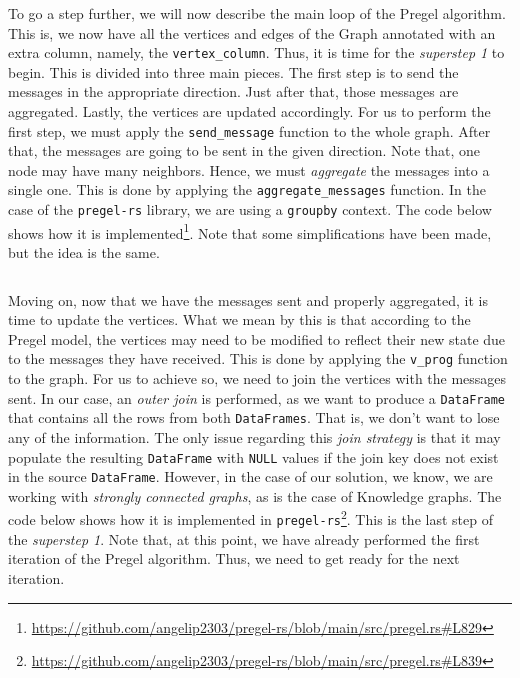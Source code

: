 \begin{code}
    \inputminted{rust}{code/listings/11-4_initial.rs}
\end{code}

To go a step further, we will now describe the main loop of the Pregel algorithm. This is, we now have all the vertices and edges of the Graph annotated with an extra column, namely, the \texttt{vertex\_column}. Thus, it is time for the \textit{superstep 1} to begin. This is divided into three main pieces. The first step is to send the messages in the appropriate direction. Just after that, those messages are aggregated. Lastly, the vertices are updated accordingly. For us to perform the first step, we must apply the \texttt{send\_message} function to the whole graph. After that, the messages are going to be sent in the given direction. Note that, one node may have many neighbors. Hence, we must \textit{aggregate} the messages into a single one. This is done by applying the \texttt{aggregate\_messages} function. In the case of the \texttt{pregel-rs} library, we are using a \texttt{groupby} context. The code below shows how it is implemented\footnote{\url{https://github.com/angelip2303/pregel-rs/blob/main/src/pregel.rs\#L829}}. Note that some simplifications have been made, but the idea is the same.

\begin{code}
    \inputminted{rust}{code/listings/11-5_msgs.rs}
\end{code}

Moving on, now that we have the messages sent and properly aggregated, it is time to update the vertices. What we mean by this is that according to the Pregel model, the vertices may need to be modified to reflect their new state due to the messages they have received. This is done by applying the \texttt{v\_prog} function to the graph. For us to achieve so, we need to join the vertices with the messages sent. In our case, an \textit{outer join} is performed, as we want to produce a \texttt{DataFrame} that contains all the rows from both \texttt{DataFrames}. That is, we don't want to lose any of the information. The only issue regarding this \textit{join strategy} is that it may populate the resulting \texttt{DataFrame} with \texttt{NULL} values if the join key does not exist in the source \texttt{DataFrame}. However, in the case of our solution, we know, we are working with \textit{strongly connected graphs}, as is the case of Knowledge graphs. The code below shows how it is implemented in \texttt{pregel-rs}\footnote{\url{https://github.com/angelip2303/pregel-rs/blob/main/src/pregel.rs\#L839}}. This is the last step of the \textit{superstep 1}. Note that, at this point, we have already performed the first iteration of the Pregel algorithm. Thus, we need to get ready for the next iteration.

